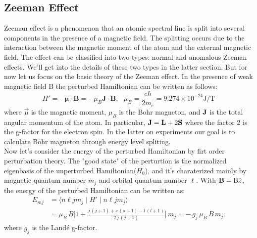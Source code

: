 \documentclass[a4paper,12pt]{article}
\begin{document}
\subsection{Zeeman Effect}
Zeeman effect is a phenomenon that an atomic spectral line is split into several components in the presence of a magnetic field. The splitting occurs due to the interaction between the magnetic moment of the atom and the external magnetic field. The effect can be classified into two types: normal and anomalous Zeeman effects. We'll get into the details of these two types in the latter section. But for now let us focus on the basic theory of the Zeeman effect. In the presence of weak magnetic field $\mathrm{B}$ the perturbed Hamiltonian can be written as follows:
\begin{equation}
H' = -\mathbf{\mu} \cdot \mathbf{B} = -\mu_B \mathbf{J} \cdot \mathbf{B} , ~~~ \mu_B = \frac{e \hbar}{2 m_e} = 9.274 \times 10^{-24} \mathrm{J/T}
\end{equation}
where $\vec{\mu}$ is the magnetic moment, $\mu_B$ is the Bohr magneton, and $\bold{J}$ is the total angular momentum of the atom. In particular, $\bold{J} = \bold{L} + 2\bold{S}$ where the factor 2 is the g-factor for the electron spin. In the latter on experiments our goal is to calculate Bohr magneton through energy level spliting. \\
\indent  Now let's consider the energy of the perturbed Hamiltonian by firt order perturbation theory. The "good state" of the perturtion is the normalized eigenbasis of the unperturbed Hamiltonian($H_0$), and it's charaterized mainly by magnetic quantum number $m_j$ and orbital quantum number $\ell$. With $\bold{B} = \mathrm{B}\hat{z}$, the energy of the perturbed Hamiltonian can be written as: 
\begin{align}
    E_{mj} 
    &= \langle n \ell jm_j \mid H' \mid n\ell jm_j \rangle \\
    &= \mu_{B}\,B \biggl[
      1 + \frac{j\,(j+1) + s\,(s+1) - l\,(l+1)}{2\,j\,(j+1)}
    \biggr] \, m_{j} 
    = -\,g_j\,\mu_{B}\,B\,m_{j}.
    \label{eq:zeeman_energy}
\end{align}
where $g_j$ is the Landé g-factor.
\end{document}
